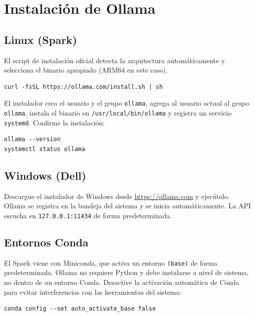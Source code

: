 \section{Instalación de Ollama}
\label{sec:install}

\subsection{Linux (Spark)}

El script de instalación oficial detecta la arquitectura automáticamente
y selecciona el binario apropiado (ARM64 en este caso).

\begin{lstlisting}[style=bashstyle, caption={Instalar Ollama en Ubuntu}]
curl -fsSL https://ollama.com/install.sh | sh
\end{lstlisting}

El instalador crea el usuario y el grupo \texttt{ollama}, agrega al
usuario actual al grupo \texttt{ollama}, instala el binario en
\texttt{/usr/local/bin/ollama} y registra un servicio \texttt{systemd}.
Confirme la instalación:

\begin{lstlisting}[style=bashstyle]
ollama --version
systemctl status ollama
\end{lstlisting}

\subsection{Windows (Dell)}

Descargue el instalador de Windows desde \url{https://ollama.com} y
ejecútelo. Ollama se registra en la bandeja del sistema y se inicia
automáticamente. La API escucha en \texttt{127.0.0.1:11434} de forma
predeterminada.

\subsection{Entornos Conda}

El Spark viene con Miniconda, que activa un entorno \texttt{(base)} de
forma predeterminada. Ollama no requiere Python y debe instalarse a
nivel de sistema, no dentro de un entorno Conda. Desactive la activación
automática de Conda para evitar interferencias con las herramientas del
sistema:

\begin{lstlisting}[style=bashstyle]
conda config --set auto_activate_base false
\end{lstlisting}

